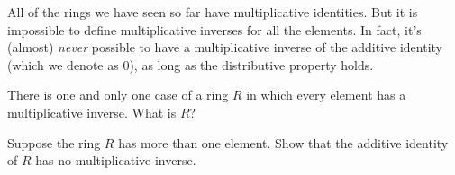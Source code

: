 

All of the rings we have seen so far have multiplicative identities. But it is impossible to define multiplicative inverses for all the elements. In fact, it's (almost) \emph{never} possible to  have a multiplicative inverse of the additive identity (which we denote as 0), as long as the distributive property holds.

\begin{exercise}{}
There is one and only one case of a ring $R$ in which every element has a multiplicative inverse. What is $R$? 
\end{exercise}

\begin{exercise}{}
Suppose the ring $R$ has more than one element.  Show that the additive identity of $R$ has no multiplicative inverse.
\end{exercise}



